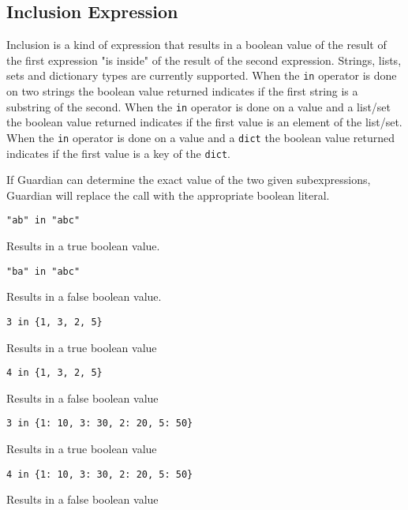 
\subsection{Inclusion Expression}
{
	Inclusion is a kind of expression that results in a boolean value of
	the result of the first expression "is inside" of the result of the
	second expression. Strings, lists, sets and dictionary types are currently
	supported.
	When the \texttt{in} operator is done
	on two strings the boolean value returned indicates if the first string
	is a substring of the second.
	When the \texttt{in} operator is done on a value and a list/set
	the boolean value returned indicates if the first value
	is an element of the list/set.
	When the \texttt{in} operator is done on a value and a \texttt{dict}
	the boolean value returned indicates if the first value
	is a key of the \texttt{dict}.
	
	If Guardian can determine the exact value of the two given subexpressions,
	Guardian will replace the call with the appropriate boolean literal.
	
	\begin{itemize}
	{
		\item[] \texttt{"ab" in "abc"}
		
			Results in a true boolean value.
		
		\item[] \texttt{"ba" in "abc"}
		
			Results in a false boolean value.
		
		\item[] \texttt{3 in \{1, 3, 2, 5\}}
		
			Results in a true boolean value
		
		\item[] \texttt{4 in \{1, 3, 2, 5\}}
		
			Results in a false boolean value
		
		\item[] \texttt{3 in \{1: 10, 3: 30, 2: 20, 5: 50\}}
		
			Results in a true boolean value
		
		\item[] \texttt{4 in \{1: 10, 3: 30, 2: 20, 5: 50\}}
		
			Results in a false boolean value
	}
	\end{itemize}
}
